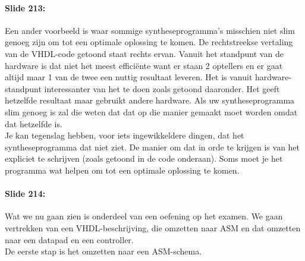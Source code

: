 \documentclass[10pt,a4paper]{book}
\begin{document}
\paragraph{Slide 213:} Een ander voorbeeld is waar sommige syntheseprogramma's misschien niet slim genoeg zijn om tot een optimale oplossing te komen. De rechtstreekse vertaling van de VHDL-code getoond staat rechts ervan. Vanuit het standpunt van de hardware is dat niet het meest effici\"ente want er staan 2 optellers en er gaat altijd maar 1 van de twee een nuttig resultaat leveren. Het is vanuit hardware-standpunt interessanter van het te doen zoals getoond daaronder. Het geeft hetzelfde resultaat maar gebruikt andere hardware. Als uw syntheseprogramma slim genoeg is zal die weten dat dat op die manier gemaakt moet worden omdat dat hetzelfde is.\\
Je kan tegenslag hebben, voor iets ingewikkeldere dingen, dat het syntheseprogramma dat niet ziet. De manier om dat in orde te krijgen is van het expliciet te schrijven (zoals getoond in de code onderaan). Soms moet je het programma wat helpen om tot een optimale oplossing te komen.

\paragraph{Slide 214:} Wat we nu gaan zien is onderdeel van een oefening op het examen. We gaan vertrekken van een VHDL-beschrijving, die omzetten naar ASM en dat omzetten naar een datapad en een controller.\\
De eerste stap is het omzetten naar een ASM-schema.
\end{document}

